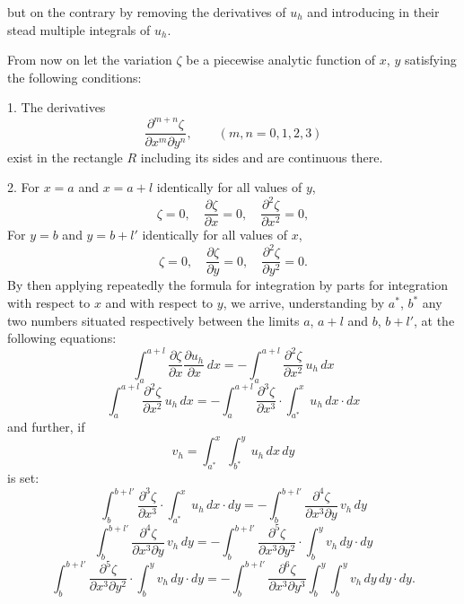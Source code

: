\documentclass{article}
\begin{document}
but on the contrary by removing the derivatives of $u_h$ and introducing in their stead multiple integrals of $u_h$.

From now on let the variation $\zeta$ be a piecewise analytic function of $x$, $y$ satisfying the following conditions:

1. The derivatives
\[
\frac{\partial^{m+n} \zeta}{\partial x^m \partial y^n}, \qquad (m, n = 0, 1, 2, 3)
\]
exist in the rectangle $R$ including its sides and are continuous there.

2. For $x=a$ and $x=a+l$ identically for all values of $y$,
\[
\zeta = 0, \quad \frac{\partial\zeta}{\partial x} = 0, \quad \frac{\partial^2\zeta}{\partial x^2} = 0,
\]
For $y=b$ and $y=b+l'$ identically for all values of $x$,
\[
\zeta = 0, \quad \frac{\partial\zeta}{\partial y} = 0, \quad \frac{\partial^2\zeta}{\partial y^2} = 0.
\]
By then applying repeatedly the formula for integration by parts for integration with respect to $x$ and with respect to $y$, we arrive, understanding by $a^*$, $b^*$ any two numbers situated respectively between the limits $a$, $a+l$ and $b$, $b+l'$, at the following equations:
\[
\int_a^{a+l} \frac{\partial\zeta}{\partial x} \frac{\partial u_h}{\partial x}\,dx = -\int_a^{a+l} \frac{\partial^2\zeta}{\partial x^2}\,u_h\,dx
\]
\[
\int_a^{a+l} \frac{\partial^2\zeta}{\partial x^2}\,u_h\,dx = -\int_a^{a+l} \frac{\partial^3\zeta}{\partial x^3} \cdot \int_{a^*}^x u_h\,dx \cdot dx
\]
and further, if
\[
v_h = \int_{a^*}^x \int_{b^*}^y u_h\,dx\,dy
\]
is set:
\[
\int_b^{b+l'} \frac{\partial^3\zeta}{\partial x^3} \cdot \int_{a^*}^x u_h\,dx \cdot dy = -\int_b^{b+l'} \frac{\partial^4\zeta}{\partial x^3 \partial y}\,v_h\,dy
\]
\[
\int_b^{b+l'} \frac{\partial^4\zeta}{\partial x^3 \partial y}\,v_h\,dy = -\int_b^{b+l'} \frac{\partial^5\zeta}{\partial x^3 \partial y^2} \cdot \int_b^y v_h\,dy \cdot dy
\]
\[
\int_b^{b+l'} \frac{\partial^5\zeta}{\partial x^3 \partial y^2} \cdot \int_b^y v_h\,dy \cdot dy = -\int_b^{b+l'} \frac{\partial^6\zeta}{\partial x^3 \partial y^3} \int_b^y \int_b^y v_h\,dy\,dy \cdot dy.
\]
\end{document}
